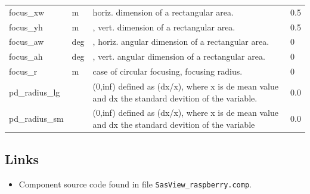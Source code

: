 \begin{longtable}{p{}p{}p{}p{}}
focus\_xw & m & horiz. dimension of a rectangular area. & 0.5 \\
focus\_yh & m & , vert. dimension of a rectangular area. & 0.5 \\
focus\_aw & deg & , horiz. angular dimension of a rectangular area. & 0 \\
focus\_ah & deg & , vert. angular dimension of a rectangular area. & 0 \\
focus\_r & m & case of circular focusing, focusing radius. & 0 \\
pd\_radius\_lg &  & (0,inf) defined as (dx/x), where x is de mean value and dx the standard devition of the variable. & 0.0 \\
pd\_radius\_sm &  & (0,inf) defined as (dx/x), where x is de mean value and dx the standard devition of the variable & 0.0 \\
\bottomrule
\end{longtable}

\subsection*{Links}
\begin{itemize}
  \item Component source code found in file \texttt{SasView\_raspberry.comp}.
\end{itemize}
